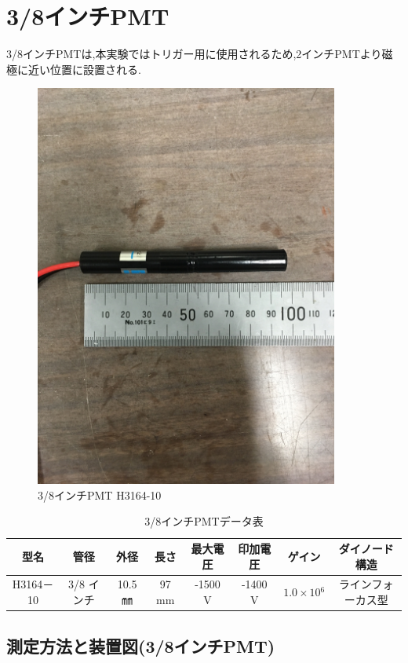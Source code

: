 \section{3/8インチPMT}
3/8インチPMT\cite{pmtR2248}は,本実験ではトリガー用に使用されるため,2インチPMTより磁極に近い位置に設置される.

\begin{figure}[H]
	\centering
		\includegraphics[width=10cm]{fig/iguchi/miniPMT.jpg}
	\caption{3/8インチPMT H3164-10}
	\label{3/8inch}
\end{figure}
\begin{table}[h]
	\centering
	
	  \begin{tabular}{cccccccc} \hline
		型名& 管径 & 外径 & 長さ & 最大電圧 & 印加電圧 & ゲイン & ダイノード構造 \\ \hline \hline
		H3164－10 & 3/8 インチ & 10.5 ㎜ & 97 mm & -1500 V & -1400 V & $1.0\times10{^{6}}$ &ラインフォーカス型 \\ \hline
	\end{tabular}
	  \caption{3/8インチPMTデータ表}
\end{table}


\subsection{測定方法と装置図(3/8インチPMT)}

